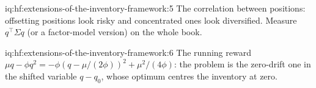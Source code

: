 \begin{solution}{iq:hf:extensions-of-the-inventory-framework:5}
The correlation between positions: offsetting positions look risky and concentrated ones look diversified. Measure $q^\top\Sigma q$ (or a
factor-model version) on the whole book.
\end{solution}

\begin{solution}{iq:hf:extensions-of-the-inventory-framework:6}
The running reward $\mu q-\phi q^2=-\phi(q-\mu/(2\phi))^2+\mu^2/(4\phi)$: the problem is the zero-drift one in the shifted variable $q-q_0$, whose
optimum centres the inventory at zero.
\end{solution}

